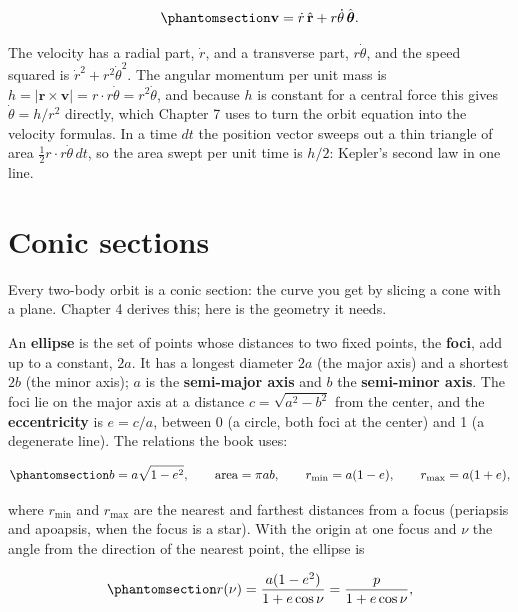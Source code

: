 \documentclass[
  10.5pt,
  letterpaper,
]{scrbook}
\theoremstyle{definition}
\theoremstyle{plain}
\theoremstyle{remark}
\begin{document}
\begin{equation}\protect\phantomsection\label{eq-polar-velocity}{
\mathbf{v} = \dot r\,\hat{\mathbf{r}} + r\dot\theta\,\hat{\boldsymbol{\theta}}.
}\end{equation}

The velocity has a radial part, \(\dot r\), and a transverse part,
\(r\dot\theta\), and the speed squared is
\(\dot r^2 + r^2\dot\theta^2\). The angular momentum per unit mass is
\(h = |\mathbf{r}\times\mathbf{v}| = r\cdot r\dot\theta = r^2\dot\theta\),
and because \(h\) is constant for a central force this gives
\(\dot\theta = h/r^2\) directly, which Chapter 7 uses to turn the orbit
equation into the velocity formulas. In a time \(dt\) the position
vector sweeps out a thin triangle of area
\(\tfrac12 r\cdot r\dot\theta\,dt\), so the area swept per unit time is
\(h/2\): Kepler's second law in one line.

\section{Conic sections}\label{conic-sections}

Every two-body orbit is a conic section: the curve you get by slicing a
cone with a plane. Chapter 4 derives this; here is the geometry it
needs.

An \textbf{ellipse} is the set of points whose distances to two fixed
points, the \textbf{foci}, add up to a constant, \(2a\). It has a
longest diameter \(2a\) (the major axis) and a shortest \(2b\) (the
minor axis); \(a\) is the \textbf{semi-major axis} and \(b\) the
\textbf{semi-minor axis}. The foci lie on the major axis at a distance
\(c = \sqrt{a^2 - b^2}\) from the center, and the \textbf{eccentricity}
is \(e = c/a\), between 0 (a circle, both foci at the center) and 1 (a
degenerate line). The relations the book uses:

\begin{equation}\protect\phantomsection\label{eq-ellipse-facts}{
b = a\sqrt{1-e^2}, \qquad \text{area} = \pi a b, \qquad r_{\min} = a(1-e), \qquad r_{\max} = a(1+e),
}\end{equation}

where \(r_{\min}\) and \(r_{\max}\) are the nearest and farthest
distances from a focus (periapsis and apoapsis, when the focus is a
star). With the origin at one focus and \(\nu\) the angle from the
direction of the nearest point, the ellipse is

\begin{equation}\protect\phantomsection\label{eq-conic-polar}{
r(\nu) = \frac{a(1-e^2)}{1 + e\cos\nu} = \frac{p}{1 + e\cos\nu},
}\end{equation}
\end{document}
